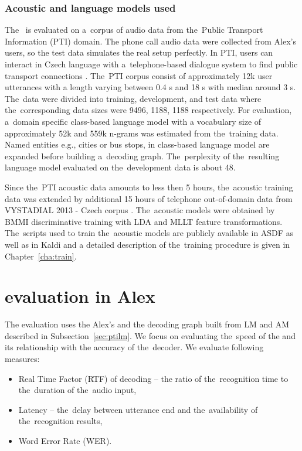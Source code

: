 \subsubsection*{Acoustic and language models used}
\label{sec:ptilm}
The~ is evaluated on a~corpus of audio data from the~Public Transport Information (PTI) domain.
The phone call audio data were collected from Alex's users, so the test data simulates the real setup perfectly.
In PTI, users can interact in Czech language with a~telephone-based dialogue system to find public transport connections \cite{ptics2014url}.
The~PTI corpus consist of approximately 12k user utterances with a length varying between 0.4 s and 18 s with median around 3 s.
The~data were divided into training, development, and test data where the~corresponding data sizes were 9496, 1188, 1188 respectively.
For evaluation, a~domain specific class-based language model with a vocabulary size of approximately 52k  and 559k n-grams was estimated from the~training data.
Named entities e.g., cities or bus stops, in class-based language model are expanded before building a~decoding graph.
The~perplexity of the~resulting language model evaluated on the~development data is about 48.

Since the~PTI acoustic data amounts to less then 5 hours, the~acoustic training data was extended by additional 15 hours of telephone out-of-domain data from VYSTADIAL 2013 - Czech corpus \cite{korvas_2014}.
The~acoustic models were obtained by BMMI discriminative training with LDA and MLLT feature transformations.
The~scripts used to train the~acoustic models are publicly available in ASDF \cite{asdf2014url} as well as in Kaldi \cite{kaldi2014url} and a detailed description of the~training procedure is given in Chapter~\ref{cha:train}. 




\section{ evaluation in Alex}
\label{sec:eval}
The evaluation uses the Alex's  and the decoding graph built from \ac{LM} and \ac{AM} described in Subsection~\ref{sec:ptilm}.
We focus on evaluating the~speed of the  and its relationship with the accuracy of the~decoder.
We evaluate following measures:
\begin{itemize}
    \item Real Time Factor (RTF) of decoding -- the ratio of the~recognition time to the~duration of the~audio input,
    \item Latency -- the~delay between utterance end and the~availability of the~recognition results,
    \item Word Error Rate (WER).
\end{itemize}

